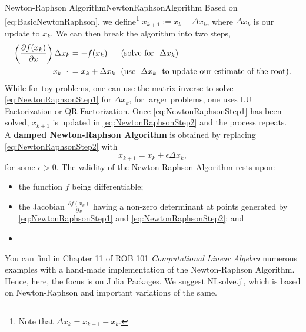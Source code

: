 \vspace*{0.2cm}
\begin{methodColor}{Newton-Raphson Algorithm}{{NewtonRaphsonAlgorithm}}
    Based on \eqref{eq:BasicNewtonRaphson}, we define\footnote{Note that $\Delta x_k = x_{k+1}-x_k$.} $x_{k+1}:= x_k + \Delta x_k$, where $ \Delta x_k$ is our update to $x_k$. We can then break the algorithm into two steps,
\begin{align}
\label{eq:NewtonRaphsonStep1}
\left(\frac{\partial f(x_k)}{\partial x} \right) \Delta x_{k} &= - f(x_k) \hspace*{0.58cm}(\text{solve for}~~\Delta x_k)  \\
\label{eq:NewtonRaphsonStep2}
x_{k+1}&= x_k + \Delta x_{k}~~(\text{use~~} \Delta x_k ~~\text{to update our estimate of the root}).
\end{align}
While for toy problems, one can use the matrix inverse to solve \eqref{eq:NewtonRaphsonStep1} for $\Delta x_{k}$, for larger problems, one uses LU Factorization or QR Factorization. Once \eqref{eq:NewtonRaphsonStep1} has been solved, $x_{k+1}$ is updated in \eqref{eq:NewtonRaphsonStep2} and the process repeats.\\

A \textbf{damped Newton-Raphson Algorithm} is obtained by replacing \eqref{eq:NewtonRaphsonStep2} with   
\begin{equation}
    \label{eq:NewtonRaphsonStep3}
x_{k+1}= x_k + \epsilon \Delta x_{k},
\end{equation}
for some $\epsilon >0$.
 The validity of the Newton-Raphson Algorithm rests upon: 
\begin{itemize}
    \item the function $f$ being differentiable;
    \item the Jacobian $\frac{\partial f(x_k)}{ \partial x}$ having a non-zero determinant at points generated by \eqref{eq:NewtonRaphsonStep1} and \eqref{eq:NewtonRaphsonStep2}; and
    \item {}
\end{itemize}
\end{methodColor}

You can find in Chapter 11 of ROB 101 \textit{Computational Linear Algebra} numerous examples with a hand-made implementation of the Newton-Raphson Algorithm. Hence, here, the focus is on Julia Packages. We suggest  \href{https://github.com/JuliaNLSolvers/NLsolve.jl}{NLsolve.jl}, which is based on Newton-Raphson and important variations of the same.

